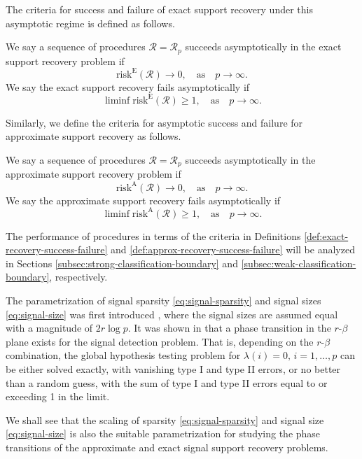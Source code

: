 The criteria for success and failure of exact support recovery under this asymptotic regime is defined as follows.
\begin{definition} \label{def:exact-recovery-success-failure}
We say a sequence of procedures $\mathcal{R} = \mathcal{R}_p$ succeeds asymptotically in the exact support recovery problem if 
\begin{equation} \label{eq:exact-recovery-success}
    \mathrm{risk}^{\mathrm{E}}(\mathcal{R}) \to 0, \quad \text{as}\quad p\to\infty.
\end{equation}
We say the exact support recovery fails asymptotically if 
\begin{equation} \label{eq:exact-recovery-failure}
    \liminf\mathrm{risk}^{\mathrm{E}}(\mathcal{R}) \ge 1, \quad \text{as}\quad p\to\infty.
\end{equation}
\end{definition}
Similarly, we define the criteria for asymptotic success and failure for approximate support recovery as follows.
\begin{definition} \label{def:approx-recovery-success-failure}
We say a sequence of procedures $\mathcal{R} = \mathcal{R}_p$ succeeds asymptotically in the approximate support recovery problem if 
\begin{equation} \label{eq:approx-recovery-success}
    \mathrm{risk}^{\mathrm{A}}(\mathcal{R}) \to 0, \quad \text{as}\quad p\to\infty.
\end{equation}
We say the approximate support recovery fails asymptotically if 
\begin{equation} \label{eq:approx-recovery-failure}
    \liminf\mathrm{risk}^{\mathrm{A}}(\mathcal{R}) \ge 1, \quad \text{as}\quad p\to\infty.
\end{equation}
\end{definition}
The performance of procedures in terms of the criteria in Definitions \ref{def:exact-recovery-success-failure} and \ref{def:approx-recovery-success-failure} will be analyzed in Sections \ref{subsec:strong-classification-boundary} and \ref{subsec:weak-classification-boundary}, respectively.

\begin{remark}
The parametrization of signal sparsity \eqref{eq:signal-sparsity} and signal sizes  \eqref{eq:signal-size} was first introduced \citet{donoho2004higher}, where the signal sizes are assumed equal with a magnitude of $2{r}\log{p}$.
It was shown in \cite{donoho2004higher} that a phase transition in the $r$-$\beta$ plane exists for the signal detection problem. 
That is, depending on the $r$-$\beta$ combination, the global hypothesis testing problem for $\lambda(i)=0,\,i=1,\ldots,p$ can be either solved exactly, with vanishing type I and type II errors, or no better than a random guess, with the sum of type I and type II errors equal to or exceeding 1 in the limit.

We shall see that the scaling of sparsity \eqref{eq:signal-sparsity} and signal size \eqref{eq:signal-size} is also the suitable parametrization for studying the phase transitions of the approximate and exact signal support recovery problems.
\end{remark}

